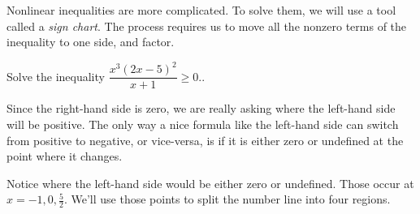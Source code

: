 \documentclass{ximera}
\begin{document}
Nonlinear inequalities are more complicated.  To solve them, we will use a tool called a \emph{sign chart}.
The process requires us to move all the nonzero terms of the inequality to one side, and factor.
\begin{example}
	Solve the inequality $\displaystyle \dfrac{x^3 \left(2x-5\right)^2}{x+1} \geq 0.$.

	\begin{explanation}
		Since the right-hand side is zero, we are really asking where the left-hand side will be positive.  The only way
		a nice formula like the left-hand side can switch from positive to negative, or vice-versa, is if it is either zero
		or undefined at the point where it changes.

		Notice where the left-hand side would be either zero or undefined.  Those occur at $x = -1, 0, \frac{5}{2}$.  
		We'll use those points to split the number line into four regions.
	\end{explanation}
	
\end{example}
\end{document}
